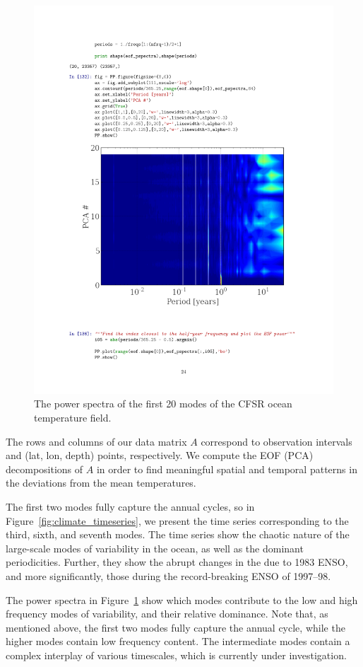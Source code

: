   \begin{figure}[h!bt]
    \centering
    \includegraphics[width=.9\columnwidth]{images/climate_spectra.pdf}
    \caption{The power spectra of the first 20 modes of the CFSR ocean temperature field.}
    \label{fig:climate_spectra}
  \end{figure} 
The rows and columns of our data matrix $A$ correspond to observation intervals
and (lat, lon, depth) points, respectively.  We compute the EOF (PCA)
decompositions of $A$ in order to find meaningful spatial and temporal patterns
in the deviations from the mean temperatures.

The first two modes fully capture the annual cycles, so in
Figure~\ref{fig:climate_timeseries}, we present the time series corresponding to the
third, sixth, and seventh modes. The time series show the chaotic nature of the
large-scale modes of variability in the ocean, as well as the dominant
periodicities. Further, they show the abrupt changes in the due to 1983 ENSO,
and more significantly, those during the record-breaking ENSO of 1997--98.

The power spectra in Figure~\ref{fig:climate_spectra} show which modes contribute to
the low and high frequency modes of variability, and their relative dominance.
Note that, as mentioned above, the first two modes fully capture the annual
cycle, while the higher modes contain low frequency content. The intermediate
modes contain a complex interplay of various timescales, which is currently
under investigation.  

